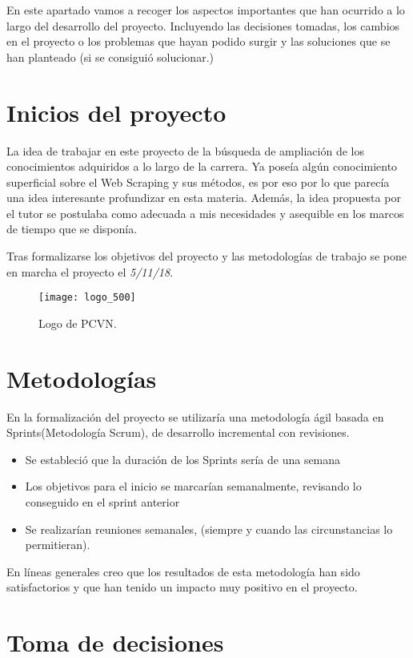 
En este apartado vamos a recoger los aspectos importantes que han ocurrido a lo largo del desarrollo del proyecto. Incluyendo las decisiones tomadas, los cambios en el proyecto o los problemas que hayan podido surgir y las soluciones que se han planteado (si se consiguió solucionar.)

\section{Inicios del proyecto}
La idea de trabajar en este proyecto de la búsqueda de ampliación de los conocimientos adquiridos a lo largo de la carrera. Ya poseía algún conocimiento superficial sobre el Web Scraping y sus métodos, es por eso por lo que parecía una idea interesante profundizar en esta materia. Además, la idea propuesta por el tutor se postulaba como adecuada a mis necesidades y asequible en los marcos de tiempo que se disponía.

Tras formalizarse los objetivos del proyecto y las metodologías de trabajo se pone en marcha el proyecto el \emph{5/11/18}.

\begin{figure}[H]
	\centering
	\texttt{[image: logo\_500]}
	\caption{Logo de PCVN.}
	\label{fig:logo}
\end{figure}


\section{Metodologías}
En la formalización del proyecto se utilizaría una metodología ágil basada en Sprints(Metodología Scrum)\cite{scrum}, de desarrollo incremental con revisiones.
\begin{itemize}
	\item	Se estableció que la duración de los Sprints sería de una semana
	\item	Los objetivos para el inicio se marcarían semanalmente, revisando lo conseguido en el sprint anterior
	\item	Se realizarían reuniones semanales, (siempre y cuando las circunstancias lo permitieran).
\end{itemize}

En líneas generales creo que los resultados de esta metodología han sido satisfactorios y que han tenido un impacto muy positivo en el proyecto.

\section{Toma de decisiones}
